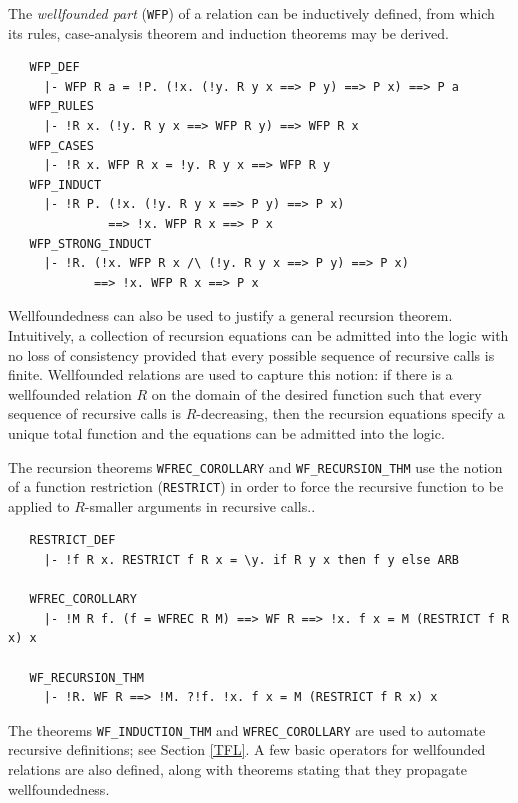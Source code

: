 {The \emph{wellfounded part} ({\small\verb+WFP+}) of a relation can be
inductively defined, from which its rules, case-analysis theorem and
induction theorems may be derived.
%
\begin{hol}
\begin{verbatim}
   WFP_DEF
     |- WFP R a = !P. (!x. (!y. R y x ==> P y) ==> P x) ==> P a
   WFP_RULES
     |- !R x. (!y. R y x ==> WFP R y) ==> WFP R x
   WFP_CASES
     |- !R x. WFP R x = !y. R y x ==> WFP R y
   WFP_INDUCT
     |- !R P. (!x. (!y. R y x ==> P y) ==> P x)
              ==> !x. WFP R x ==> P x
   WFP_STRONG_INDUCT
     |- !R. (!x. WFP R x /\ (!y. R y x ==> P y) ==> P x)
            ==> !x. WFP R x ==> P x
\end{verbatim}
\end{hol}

Wellfoundedness can also be used to justify a general recursion
theorem. Intuitively, a collection of recursion equations can be
admitted into the \HOL{} logic with no loss of consistency provided
that every possible sequence of recursive calls is finite. Wellfounded
relations are used to capture this notion: if there is a wellfounded
relation $R$ on the domain of the desired function such that every
sequence of recursive calls is $R$-decreasing, then the recursion
equations specify a unique total function and the equations can be
admitted into the logic.

The recursion theorems {\small\verb+WFREC_COROLLARY+} and
{\small\verb+WF_RECURSION_THM+} use the notion of a function
restriction ({\small\verb+RESTRICT+}) in order to force the recursive
function to be applied to $R$-smaller arguments in recursive calls..
%
\begin{hol}
\begin{verbatim}
   RESTRICT_DEF
     |- !f R x. RESTRICT f R x = \y. if R y x then f y else ARB

   WFREC_COROLLARY
     |- !M R f. (f = WFREC R M) ==> WF R ==> !x. f x = M (RESTRICT f R x) x

   WF_RECURSION_THM
     |- !R. WF R ==> !M. ?!f. !x. f x = M (RESTRICT f R x) x
\end{verbatim}
\end{hol}

\noindent The theorems {\small\verb+WF_INDUCTION_THM+} and
{\small\verb+WFREC_COROLLARY+} are used to automate recursive
definitions; see Section \ref{TFL}. A few basic operators for
wellfounded relations are also defined, along with theorems stating
that they propagate wellfoundedness.

}

